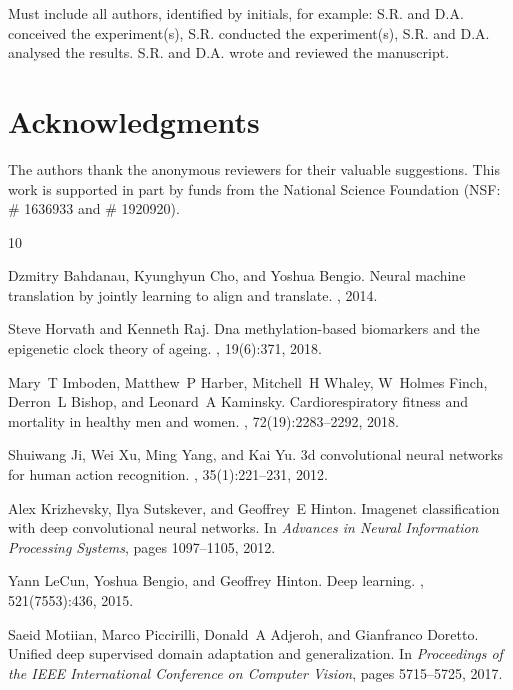 \documentclass[unnumsec,webpdf,modern,large]{oup-authoring-template}
\theoremstyle{thmstyleone}%
\theoremstyle{thmstyletwo}%
\theoremstyle{thmstylethree}%
\begin{document}
Must include all authors, identified by initials, for example:
S.R. and D.A. conceived the experiment(s),  S.R. conducted the experiment(s), S.R. and D.A. analysed the results.  S.R. and D.A. wrote and reviewed the manuscript.

\section{Acknowledgments}
The authors thank the anonymous reviewers for their valuable suggestions. This work is supported in part by funds from the National Science Foundation (NSF: \# 1636933 and \# 1920920).


\begin{thebibliography}{10}

Dzmitry Bahdanau, Kyunghyun Cho, and Yoshua Bengio.
\newblock Neural machine translation by jointly learning to align and translate.
, 2014.

Steve Horvath and Kenneth Raj.
\newblock Dna methylation-based biomarkers and the epigenetic clock theory of ageing.
, 19(6):371, 2018.

Mary~T Imboden, Matthew~P Harber, Mitchell~H Whaley, W~Holmes Finch, Derron~L Bishop, and Leonard~A Kaminsky.
\newblock Cardiorespiratory fitness and mortality in healthy men and women.
, 72(19):2283--2292, 2018.

Shuiwang Ji, Wei Xu, Ming Yang, and Kai Yu.
\newblock 3d convolutional neural networks for human action recognition.
, 35(1):221--231, 2012.

Alex Krizhevsky, Ilya Sutskever, and Geoffrey~E Hinton.
\newblock Imagenet classification with deep convolutional neural networks.
\newblock In {\em Advances in Neural Information Processing Systems}, pages 1097--1105, 2012.

Yann LeCun, Yoshua Bengio, and Geoffrey Hinton.
\newblock Deep learning.
, 521(7553):436, 2015.

Saeid Motiian, Marco Piccirilli, Donald~A Adjeroh, and Gianfranco Doretto.
\newblock Unified deep supervised domain adaptation and generalization.
\newblock In {\em Proceedings of the IEEE International Conference on Computer Vision}, pages 5715--5725, 2017.


\end{thebibliography}
\end{document}
